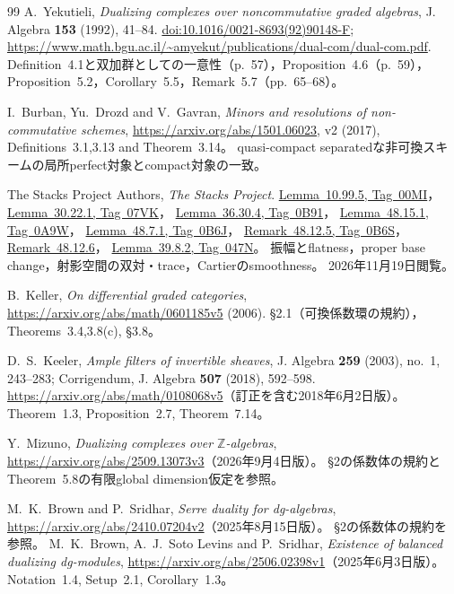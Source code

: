 \documentclass[11pt,a4paper]{ltjsarticle}
\numberwithin{equation}{section}
\begin{document}
\begin{thebibliography}{99}
A.~Yekutieli,
\emph{Dualizing complexes over noncommutative graded algebras},
J. Algebra \textbf{153} (1992), 41--84.
\href{https://doi.org/10.1016/0021-8693(92)90148-F}{doi:10.1016/0021-8693(92)90148-F};
\url{https://www.math.bgu.ac.il/~amyekut/publications/dual-com/dual-com.pdf}.
Definition~4.1と双加群としての一意性（p.~57），Proposition~4.6（p.~59），
Proposition~5.2，Corollary~5.5，Remark~5.7（pp.~65--68）。

I.~Burban, Yu.~Drozd and V.~Gavran,
\emph{Minors and resolutions of non-commutative schemes},
\url{https://arxiv.org/abs/1501.06023}, v2 (2017),
Definitions~3.1,3.13 and Theorem~3.14。
quasi-compact separatedな非可換スキームの局所perfect対象とcompact対象の一致。

The Stacks Project Authors, \emph{The Stacks Project}.
\href{https://stacks.math.columbia.edu/tag/00MI}{Lemma~10.99.5, Tag~00MI}，
\href{https://stacks.math.columbia.edu/tag/07VK}{Lemma~30.22.1, Tag~07VK}，
\href{https://stacks.math.columbia.edu/tag/0B91}{Lemma~36.30.4, Tag~0B91}，
\href{https://stacks.math.columbia.edu/tag/0A9W}{Lemma~48.15.1, Tag~0A9W}，
\href{https://stacks.math.columbia.edu/tag/0B6J}{Lemma~48.7.1, Tag~0B6J}，
\href{https://stacks.math.columbia.edu/tag/0B6S}{Remark~48.12.5, Tag~0B6S}，
\href{https://stacks.math.columbia.edu/tag/0E4H}{Remark~48.12.6}，
\href{https://stacks.math.columbia.edu/tag/047N}{Lemma~39.8.2, Tag~047N}。
振幅とflatness，proper base change，射影空間の双対・trace，Cartierのsmoothness。
2026年11月19日閲覧。

B.~Keller, \emph{On differential graded categories},
\url{https://arxiv.org/abs/math/0601185v5} (2006).
\S2.1（可換係数環の規約），Theorems~3.4,3.8(c), \S3.8。

D.~S.~Keeler, \emph{Ample filters of invertible sheaves},
J. Algebra \textbf{259} (2003), no.~1, 243--283;
Corrigendum, J. Algebra \textbf{507} (2018), 592--598.
\url{https://arxiv.org/abs/math/0108068v5}（訂正を含む2018年6月2日版）。
Theorem~1.3, Proposition~2.7, Theorem~7.14。

Y.~Mizuno, \emph{Dualizing complexes over $\mathbb Z$-algebras},
\url{https://arxiv.org/abs/2509.13073v3}（2026年9月4日版）。
\S2の係数体の規約とTheorem~5.8の有限global dimension仮定を参照。

M.~K.~Brown and P.~Sridhar, \emph{Serre duality for dg-algebras},
\url{https://arxiv.org/abs/2410.07204v2}（2025年8月15日版）。
\S2の係数体の規約を参照。
M.~K.~Brown, A.~J.~Soto Levins and P.~Sridhar,
\emph{Existence of balanced dualizing dg-modules},
\url{https://arxiv.org/abs/2506.02398v1}（2025年6月3日版）。
Notation~1.4, Setup~2.1, Corollary~1.3。


\end{thebibliography}
\end{document}
